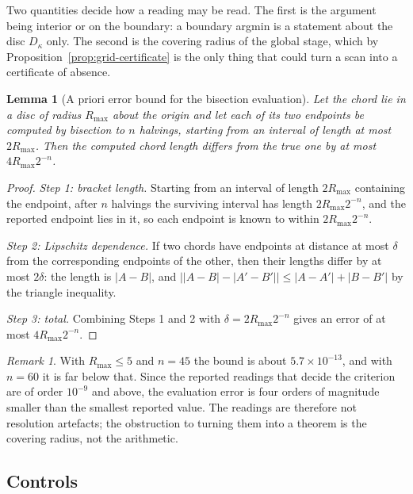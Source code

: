 \documentclass[11pt]{article}
\newtheorem{lemma}[theorem]{Lemma}
\theoremstyle{definition}
\theoremstyle{remark}
\newtheorem{remark}[theorem]{Remark}
\begin{document}
{Two quantities decide how a reading may be read. The first is the argument being interior or on the boundary: a
boundary argmin is a statement about the disc $D_\kappa$ only. The second is the covering radius of the global
stage, which by Proposition~\ref{prop:grid-certificate} is the only thing that could turn a scan into a
certificate of absence.

\begin{lemma}[A priori error bound for the bisection evaluation]\label{lem:bisection}
Let the chord lie in a disc of radius $R_{\max}$ about the origin and let each of its two endpoints be computed by
bisection to $n$ halvings, starting from an interval of length at most $2R_{\max}$. Then the computed chord
length differs from the true one by at most $4R_{\max}2^{-n}$.
\end{lemma}

\begin{proof}
\emph{Step 1: bracket length.} Starting from an interval of length $2R_{\max}$ containing the endpoint, after $n$
halvings the surviving interval has length $2R_{\max}2^{-n}$, and the reported endpoint lies in it, so each
endpoint is known to within $2R_{\max}2^{-n}$.

\emph{Step 2: Lipschitz dependence.} If two chords have endpoints at distance at most $\delta$ from the
corresponding endpoints of the other, then their lengths differ by at most $2\delta$: the length is
$|A-B|$, and $\bigl||A-B|-|A'-B'|\bigr|\le|A-A'|+|B-B'|$ by the triangle inequality.

\emph{Step 3: total.} Combining Steps 1 and 2 with $\delta=2R_{\max}2^{-n}$ gives an error of at most
$4R_{\max}2^{-n}$.
\end{proof}

\begin{remark}
With $R_{\max}\le5$ and $n=45$ the bound is about $5.7\times10^{-13}$, and with $n=60$ it is far below that. Since
the reported readings that decide the criterion are of order $10^{-9}$ and above, the evaluation error is four
orders of magnitude smaller than the smallest reported value. The readings are therefore not resolution
artefacts; the obstruction to turning them into a theorem is the covering radius, not the arithmetic.
\end{remark}

\subsection{Controls}

}
\end{document}
